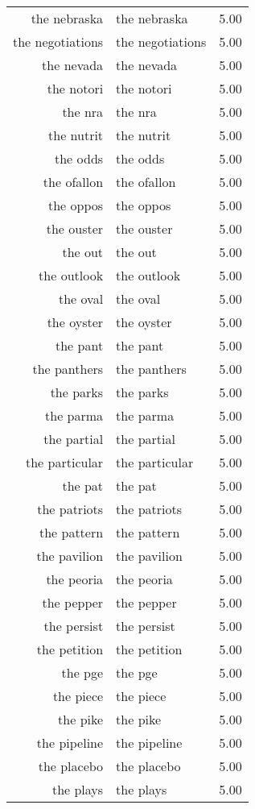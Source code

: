 \begin{table}[ht]
\begin{tabular}{rlr}
  the nebraska & the nebraska & 5.00 \\ 
  the negotiations & the negotiations & 5.00 \\ 
  the nevada & the nevada & 5.00 \\ 
  the notori & the notori & 5.00 \\ 
  the nra & the nra & 5.00 \\ 
  the nutrit & the nutrit & 5.00 \\ 
  the odds & the odds & 5.00 \\ 
  the ofallon & the ofallon & 5.00 \\ 
  the oppos & the oppos & 5.00 \\ 
  the ouster & the ouster & 5.00 \\ 
  the out & the out & 5.00 \\ 
  the outlook & the outlook & 5.00 \\ 
  the oval & the oval & 5.00 \\ 
  the oyster & the oyster & 5.00 \\ 
  the pant & the pant & 5.00 \\ 
  the panthers & the panthers & 5.00 \\ 
  the parks & the parks & 5.00 \\ 
  the parma & the parma & 5.00 \\ 
  the partial & the partial & 5.00 \\ 
  the particular & the particular & 5.00 \\ 
  the pat & the pat & 5.00 \\ 
  the patriots & the patriots & 5.00 \\ 
  the pattern & the pattern & 5.00 \\ 
  the pavilion & the pavilion & 5.00 \\ 
  the peoria & the peoria & 5.00 \\ 
  the pepper & the pepper & 5.00 \\ 
  the persist & the persist & 5.00 \\ 
  the petition & the petition & 5.00 \\ 
  the pge & the pge & 5.00 \\ 
  the piece & the piece & 5.00 \\ 
  the pike & the pike & 5.00 \\ 
  the pipeline & the pipeline & 5.00 \\ 
  the placebo & the placebo & 5.00 \\ 
  the plays & the plays & 5.00 \\ 

\end{tabular}
\end{table}
